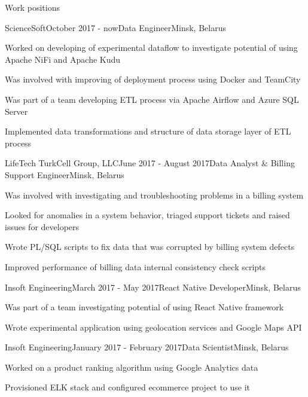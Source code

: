 \documentclass{resume} %
\begin{document}

\begin{rSection}{Work positions}

\begin{rSubsection}{ScienceSoft}{October 2017 - now}{Data Engineer}{Minsk, Belarus}
\item Worked on developing of experimental dataflow to investigate potential of using Apache NiFi and Apache Kudu
\item Was involved with improving of deployment process using Docker and TeamCity
\item Was part of a team developing ETL process via Apache Airflow and Azure SQL Server
\item Implemented data transformations and structure of data storage layer of ETL process
\end{rSubsection}

\begin{rSubsection}{LifeTech TurkCell Group, LLC}{June 2017 - August 2017}{Data Analyst \& Billing Support Engineer}{Minsk, Belarus}
\item Was involved with investigating and troubleshooting problems in a billing system
\item Looked for anomalies in a system behavior, triaged support tickets and raised issues for developers
\item Wrote PL/SQL scripts to fix data that was corrupted by billing system defects
\item Improved performance of billing data internal consistency check scripts
\end{rSubsection}

\begin{rSubsection}{Insoft Engineering}{March 2017 - May 2017}{React Native Developer}{Minsk, Belarus}
\item Was part of a team investigating potential of using React Native framework
\item Wrote experimental application using geolocation services and Google Maps API
\end{rSubsection}

\begin{rSubsection}{Insoft Engineering}{January 2017 - February 2017}{Data Scientist}{Minsk, Belarus}
\item Worked on a product ranking algorithm using Google Analytics data
\item Provisioned ELK stack and configured ecommerce project to use it
\end{rSubsection}


\end{rSection}
\end{document}
